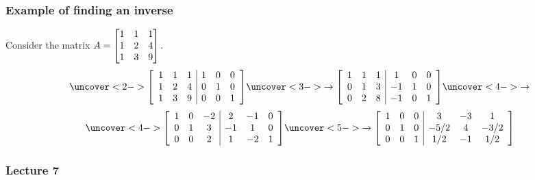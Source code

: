 \documentclass[9pt]{beamer}
\begin{document}
\begin{frame}[t]
 \frametitle{Example of finding an inverse}
 
 Consider the matrix $A=\left[\begin{matrix} 1&1&1\\1&2&4\\1&3&9\end{matrix}\right]$. 
 \[
  \uc<2->{\left[\begin{array}{ccc|ccc}
   1 & 1 & 1 & 1 & 0 & 0 \\
   1 & 2 & 4 & 0 & 1 & 0 \\
   1 & 3 & 9 & 0 & 0 & 1
  \end{array}\right]}
  \uc<3->{\to
  \left[\begin{array}{ccc|ccc}
   1 & 1 & 1 & 1 & 0 & 0 \\
   0 & 1 & 3 &-1 & 1 & 0 \\
   0 & 2 & 8 &-1 & 0 & 1
  \end{array}\right]}
  \uc<4->{\to}
 \] \[
  \uc<4->{\left[\begin{array}{ccc|ccc}
   1 & 0 &-2 & 2 &-1 & 0 \\
   0 & 1 & 3 &-1 & 1 & 0 \\
   0 & 0 & 2 & 1 &-2 & 1
  \end{array}\right]}
  \uc<5->{\to
  \left[\begin{array}{ccc|ccc}
   1 & 0 & 0 & 3 &-3 & 1 \\
   0 & 1 & 0 &-5/2 & 4 & -3/2 \\
   0 & 0 & 1 & 1/2 &-1 & 1/2
  \end{array}\right]}
 \]
\end{frame}

\begin{frame}\frametitle{Lecture 7}\end{frame}
\end{document}
